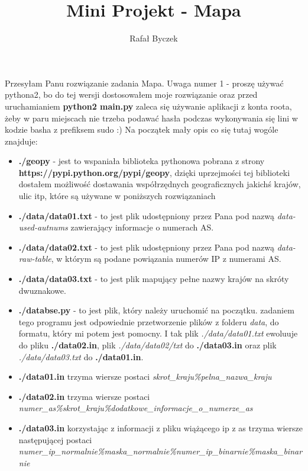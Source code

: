 \documentclass[11pt,a4paper]{article}
\author{Rafał Byczek}
\title{Mini Projekt - Mapa}
\begin{document}
\maketitle
Przesyłam Panu rozwiązanie zadania Mapa. Uwaga numer 1 - proszę używać pythona2, bo do tej wersji dostosowałem moje rozwiązanie oraz przed uruchamianiem \textbf{python2 main.py} zaleca się używanie aplikacji z konta roota, żeby w paru miejscach nie trzeba podawać hasła podczas wykonywania się lini w kodzie basha z prefiksem sudo :) Na początek mały opis co się tutaj wogóle znajduje:

\begin{itemize}
\item \textbf{./geopy} - jest to wspaniała biblioteka pythonowa pobrana z strony \\ \textbf{https://pypi.python.org/pypi/geopy}, dzięki uprzejmości tej biblioteki dostałem możliwość dostawania współrzędnych geograficznych jakichś krajów, ulic itp, które są używane w poniższych rozwiązaniach

\item \textbf{./data/data01.txt} - to jest plik udostępniony przez Pana pod nazwą \textit{data-used-autnums} zawierający informacje o numerach AS.
\item \textbf{./data/data02.txt} - to jest plik udostępniony przez Pana pod nazwą \textit{data-raw-table}, w którym są podane powiązania numerów IP z numerami AS.
\item \textbf{./data/data03.txt} - to jest plik mapujący pełne nazwy krajów na skróty dwuznakowe.
\item \textbf{./databse.py} - to jest plik, który należy uruchomić na początku. zadaniem tego programu jest odpowiednie przetworzenie plików z folderu \textit{data}, do formatu, który mi potem jest pomocny. I tak plik \textit{./data/data01.txt} ewoluuje do pliku \textbf{./data02.in}, plik \textit{./data/data02/txt} do \textbf{./data03.in} oraz plik \textit{./data/data03.txt} do \textbf{./data01.in}.
\item \textbf{./data01.in} trzyma wiersze postaci \textit{skrot\_kraju\%pelna\_nazwa\_kraju}
\item \textbf{./data02.in} trzyma wiersze postaci 
\textit{numer\_as\%skrot\_kraju\%dodatkowe\_informacje\_o\_numerze\_as}
\item \textbf{./data03.in} korzystając z informacji z pliku wiążącego ip z as trzyma wiersze następującej postaci
\textit{numer\_ip\_normalnie\%maska\_normalnie\%numer\_ip\_binarnie\%maska\_binarnie}
\end{itemize}
\end{document}
